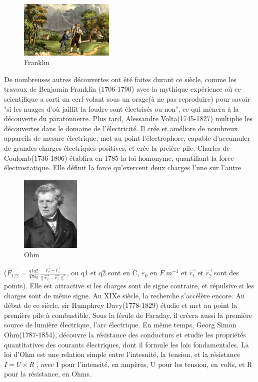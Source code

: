 \documentclass[12pt]{report}
\begin{document}
\begin{figure}
  \begin{center}
    \includegraphics[width=0.4\textwidth]{franklin}
  \end{center}
  \caption{Franklin}
\end{figure}
De nombreuses autres découvertes ont été faites durant ce siècle, comme les travaux de Benjamin Franklin (1706-1790) avec la mythique expérience où ce scientifique a sorti un cerf-volant sous un orage(à ne pas reproduire) pour savoir "si les nuages d'où jaillit la foudre sont électrisés ou non", ce qui mènera à la découverte du paratonnerre. Plus tard, Alessandre Volta(1745-1827) multiplie les découvertes dans le domaine de l'électricité. Il crée et améliore de nombreux appareils de mesure électrique, met au point l'électrophore, capable d'accumuler de grandes charges électriques positives, et crée la preière pile. Charles de Coulomb(1736-1806) établira en 1785 la loi homonyme, quantifiant la force électrostatique. Elle définit la force qu'exercent deux charges l'une sur l'autre
\begin{figure}
  \begin{center}
    \includegraphics[width=0.25\textwidth]{ohm}
  \end{center}
  \caption{Ohm}
\end{figure}
 (\(\vec{F_{1/2}}=\frac{q1q2}{4\pi \varepsilon _{0}}\frac{\vec{r_{2}}-\vec{r_{1}}}{\| \vec{r_{2}}-\vec{r_{1}} \|  ^{3}} \), ou q1 et q2 sont en C, \(\varepsilon _{0}\) en \(F.m^{-1}\) et \(\vec{r_{1}}\) et \(\vec{r_{2}}\)
sont des points). Elle est attractive si les charges sont de signe contraire, et répulsive si les charges sont de même signe. Au XIXe siècle, la recherche s'accélère encore. Au début de ce siècle, sir Humphrey Davy(1778-1829) étudie et met au point la première pile à combustible. Sous la férule de Faraday, il créera aussi la première source de lumière électrique, l'arc électrique. En même temps, Georg Simon Ohm(1787-1854), découvre la résistance des conducturs et etudie les propriétés quantitatives des courants électriques, dont il formule les lois fondamentales. La loi d'Ohm est une relation simple entre l'intesnité, la tension, et la résistance \( I = U \times R \) , avec I pour l'intensité, en ampères, U pour les tension, en volts, et R pour la résistance, en Ohms.
    
\end{document}
